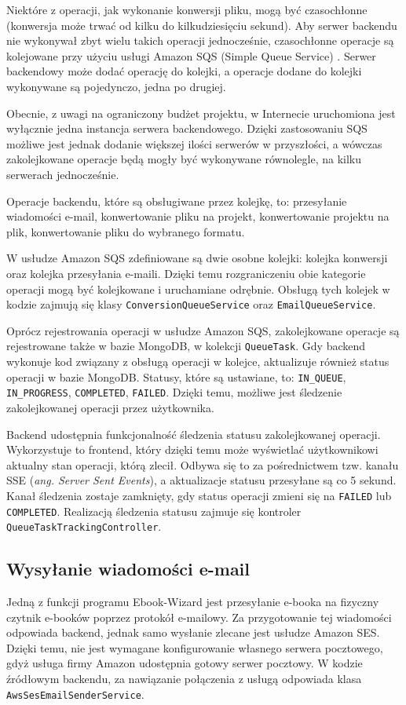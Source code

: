 Niektóre z operacji, jak wykonanie konwersji pliku, mogą być czasochłonne (konwersja może trwać od kilku do kilkudziesięciu sekund). Aby serwer backendu nie wykonywał zbyt wielu takich operacji jednocześnie, czasochłonne operacje są kolejowane przy użyciu usługi Amazon SQS (Simple Queue Service) \cite{amazon_sqs_docs}. Serwer backendowy może dodać operację do kolejki, a operacje dodane do kolejki wykonywane są pojedynczo, jedna po drugiej.

Obecnie, z uwagi na ograniczony budżet projektu, w Internecie uruchomiona jest wyłącznie jedna instancja serwera backendowego. Dzięki zastosowaniu SQS możliwe jest jednak dodanie większej ilości serwerów w przyszłości, a wówczas zakolejkowane operacje będą mogły być wykonywane równolegle, na kilku serwerach jednocześnie.

Operacje backendu, które są obsługiwane przez kolejkę, to: przesyłanie wiadomości e-mail, konwertowanie pliku na projekt, konwertowanie projektu na plik, konwertowanie pliku do wybranego formatu.

W usłudze Amazon SQS zdefiniowane są dwie osobne kolejki: kolejka konwersji oraz kolejka przesyłania e-maili. Dzięki temu rozgraniczeniu obie kategorie operacji mogą być kolejkowane i uruchamiane odrębnie. Obsługą tych kolejek w kodzie zajmują się klasy \verb|ConversionQueueService| oraz \verb|EmailQueueService|.

Oprócz rejestrowania operacji w usłudze Amazon SQS, zakolejkowane operacje są rejestrowane także w bazie MongoDB, w kolekcji \verb|QueueTask|. Gdy backend wykonuje kod związany z obsługą operacji w kolejce, aktualizuje również status operacji w bazie MongoDB. Statusy, które są ustawiane, to: \verb|IN_QUEUE|, \verb|IN_PROGRESS|, \verb|COMPLETED|, \verb|FAILED|. Dzięki temu, możliwe jest śledzenie zakolejkowanej operacji przez użytkownika.

Backend udostępnia funkcjonalność śledzenia statusu zakolejkowanej operacji. Wykorzystuje to frontend, który dzięki temu może wyświetlać użytkownikowi aktualny stan operacji, którą zlecił. Odbywa się to za pośrednictwem tzw. kanału SSE (\textit{ang. Server Sent Events}), a aktualizacje statusu przesyłane są co 5 sekund. Kanał śledzenia zostaje zamknięty, gdy status operacji zmieni się na \verb|FAILED| lub \verb|COMPLETED|. Realizacją śledzenia statusu zajmuje się kontroler \verb|QueueTaskTrackingController|.

\subsection{Wysyłanie wiadomości e-mail}
Jedną z funkcji programu Ebook-Wizard jest przesyłanie e-booka na fizyczny czytnik e-booków poprzez protokół e-mailowy. Za przygotowanie tej wiadomości odpowiada backend, jednak samo wysłanie zlecane jest usłudze Amazon SES. \cite{amazon_ses_docs} Dzięki temu, nie jest wymagane konfigurowanie własnego serwera pocztowego, gdyż usługa firmy Amazon udostępnia gotowy serwer pocztowy. W kodzie źródłowym backendu, za nawiązanie połączenia z usługą odpowiada klasa \verb|AwsSesEmailSenderService|.

